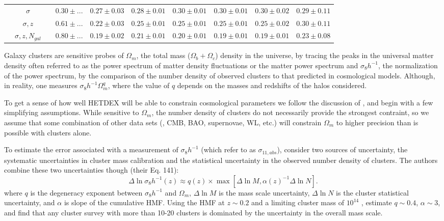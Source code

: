 \documentclass[fleqn,usenatbib]{mnras}
\begin{document}
\begin{table}
\begin{tabular}{cccccccccc}
		&$\sigma$ & \nd & $0.30\pm{...}$ & $0.27\pm{0.03}$ & $0.28\pm{0.01}$ & $0.30\pm{0.01}$ & $0.30\pm{0.01}$ & $0.30\pm{0.02}$ & $0.29\pm{0.11}$ \\
		&$\sigma, z$ & \nd & $0.61\pm{...}$ & $0.22\pm{0.03}$ & $0.25\pm{0.01}$ & $0.25\pm{0.01}$ & $0.25\pm{0.01}$ & $0.25\pm{0.02}$ & $0.30\pm{0.11}$ \\
		&$\sigma, z, N_{gal}$ & \nd & $0.80\pm{...}$ & $0.19\pm{0.02}$ & $0.21\pm{0.01}$ & $0.20\pm{0.01}$ & $0.19\pm{0.01}$ & $0.19\pm{0.01}$ & $0.23\pm{0.08}$ \\
	\hline
	\end{tabular}
\label{tbl:mass scatter}
\end{table}

Galaxy clusters are sensitive probes of $\Omega_m$, the total mass ($\Omega_b + \Omega_c$) density in the universe, by tracing the peaks in the universal matter density often referred to as the power spectrum of matter density fluctuations or the matter power spectrum and $\sigma_8h^{-1}$, the normalization of the power spectrum, by the comparison of the number density of observed clusters to that predicted in cosmological models. Although, in reality, one measures $\sigma_8h^{-1}\Omega_m^q$, where the value of $q$ depends on the masses and redshifts of the halos considered.

To get a sense of how well HETDEX will be able to constrain cosmological parameters we follow the discussion of \cite{Weinberg2013}, and begin with a few simplifying assumptions. While sensitive to $\Omega_m$, the number density of clusters do not necessarily provide the strongest contraint, so we assume that some combination of other data sets (\eg, CMB, BAO, supernovae, WL, etc.) will constrain $\Omega_m$ to higher precision than is possible with clusters alone. 

To estimate the error associated with a measurement of $\sigma_8h^{-1}$ (which \citealt{Weinberg2013} refer to as $\sigma_{11,abs}$), \cite{Weinberg2013} consider two sources of uncertainty, the systematic uncertainties in cluster mass calibration and the statistical uncertainty in the observed number density of clusters. The authors combine these two uncertainties though (their Eq. 141):
\begin{equation}
\Delta \ln \sigma_8h^{-1}(z) \approx q(z)\times 
        \max\left[ \Delta \ln M, \alpha(z)^{-1} \Delta \ln N \right].
\label{eq:sigElapprox}
\end{equation}
where $q$ is the degeneracy exponent between $\sigma_8h^{-1}$ and $\Omega_m$, $\Delta \ln M$ is the mass scale uncertainty, $\Delta \ln N$ is the cluster statistical uncertainty, and $\alpha$ is slope of the cumulative HMF. Using the \cite{Tinker2008} HMF at $z\sim0.2$ and a limiting cluster mass of $10^{14}$ \Msol, \cite{Weinberg2013} estimate $q\sim0.4$, $\alpha\sim3$, and find that any cluster survey with more than 10-20 clusters is dominated by the uncertainty in the overall mass scale.
\end{document}
